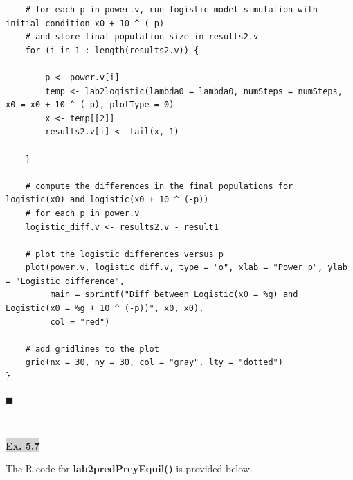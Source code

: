 \documentclass[11pt]{article}
\newcommand{\mybox}{%
    \collectbox{%
        \setlength{\fboxsep}{2pt}%
        \fbox{\BOXCONTENT}%
    }%
}
\begin{document}
\begin{lstlisting}
	# for each p in power.v, run logistic model simulation with initial condition x0 + 10 ^ (-p)	
	# and store final population size in results2.v
	for (i in 1 : length(results2.v)) {

		p <- power.v[i]
		temp <- lab2logistic(lambda0 = lambda0, numSteps = numSteps, x0 = x0 + 10 ^ (-p), plotType = 0)
		x <- temp[[2]]
		results2.v[i] <- tail(x, 1)

	}
	
	# compute the differences in the final populations for logistic(x0) and logistic(x0 + 10 ^ (-p))
	# for each p in power.v		
	logistic_diff.v <- results2.v - result1	
	
	# plot the logistic differences versus p	
	plot(power.v, logistic_diff.v, type = "o", xlab = "Power p", ylab = "Logistic difference", 
	     main = sprintf("Diff between Logistic(x0 = %g) and Logistic(x0 = %g + 10 ^ (-p))", x0, x0),
	     col = "red")

	# add gridlines to the plot
	grid(nx = 30, ny = 30, col = "gray", lty = "dotted")
}
\end{lstlisting}

\hfill$\blacksquare$


\vfill
\begin{center}
\end{center}
\begin{center}
\vspace{-0.6cm}
\hrulefill \\
\vspace{-0.7cm}
\hrulefill
\end{center}

\pagebreak

\noindent\mybox{\colorbox{lightgray}{\textbf{Ex. 5.7}}}\hspace{3mm}\hrulefill 

\noindent The R code for \textbf{lab2predPreyEquil()} is provided below.

\vspace{3mm}
\end{document}
